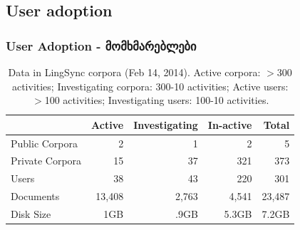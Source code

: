 \documentclass{beamer}
\begin{document}
\subsection{User adoption}

\begin{frame}

\frametitle{User Adoption - მომხმარებლები}
\begin{table}[h]
\begin{center}
\scriptsize
\begin{tabular}{lrrrr}
      \toprule
                     ~ &  Active & Investigating & In-active & Total\\
      \midrule
      Public Corpora  &       2 &   1 &   2 & 5 \\
      Private Corpora &      15 &  37 & 321 & 373\\
      Users           &      38 &  43 & 220 & 301 \\
      Documents & 13,408 & 2,763 & 4,541 &23,487\\
      Disk Size & 1GB & .9GB & 5.3GB& 7.2GB\\

      \bottomrule

\end{tabular}
\caption{Data in LingSync corpora (Feb 14, 2014). Active corpora: $>$300
activities; Investigating corpora: 300-10 activities; Active users: $>$100
activities; Investigating users: 100-10 activities.}
\label{lingsync-data}
 \end{center}
 \normalsize
\end{table}

\end{frame}
\end{document}
